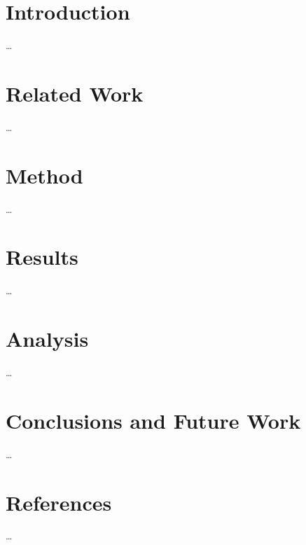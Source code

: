 \documentclass[oneside]{bthdiss} %
\begin{document}
\newcommand{\bthdissthesisno}{\textbf{DEPT}-\textbf{YEAR}-\textbf{NO}} %
\newcommand{\bthdissthesistitle}{\textbf{Centered Title Times Font}\\\vspace{0.25cm}\textbf{Size 24 Bold}} %
\newcommand{\bthdissthesissubtitle}{\textbf{Centered Subtitle Times Font}\\\vspace{0.25cm}\textbf{Size 16 Bold}} %
\newcommand{\bthdissfirstname}{Firstname} %
\newcommand{\bthdisslastname}{Lastname} %
\newcommand{\bthdissdegree}{Master of Science in Computer Science} %
\newcommand{\bthdissdept}{Dept. Computer Science \& Engineering} %
\newcommand{\bthdissnumweeks}{\textbf{XX}} %
\newcommand{\bthdissemail}{\href{mailto:acroyy@student.bth.se}{acroyy@student.bth.se}} %
\newcommand{\bthdissadvisoruni}{Prof. Firstname Lastname} %
\newcommand{\bthdissadvisorext}{Dr. Firstname Lastname} %
\newcommand{\bthdissadvisorextorg}{Corporation AB} %




\pagestyle{plain}
\setcounter{page}{1}

\begingroup
\let\cleardoublepage\clearpage
\tableofcontents
\endgroup

\cleardoublepage
\pagestyle{headings}

\chapter{Introduction}
\ldots

\chapter{Related Work}
\ldots

\chapter{Method}
\ldots

\chapter{Results}
\ldots

\chapter{Analysis}
\ldots

\chapter{Conclusions and Future Work}
\ldots

\chapter*{References}
\ldots
\end{document}
